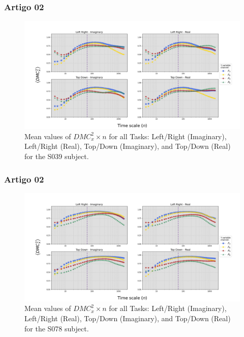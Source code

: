 \documentclass[11pt, aspectratio=169]{beamer}
\begin{document}
\begin{frame}
  \frametitle{Artigo 02}

  \begin{figure}[!h]
    \includegraphics[height=.5\paperheight]{../Figures/art_02/Fig5.jpg}
    \caption{Mean values of $DMC_{x}^{2} \times n$ for all Tasks: Left/Right (Imaginary), Left/Right (Real), Top/Down (Imaginary), and Top/Down (Real) for the S039 subject.}
    \label{fig05}
  \end{figure}
\end{frame}


\begin{frame}
  \frametitle{Artigo 02}

  \begin{figure}[!h]
    \includegraphics[height=.5\paperheight]{../Figures/art_02/Fig6.jpg}
    \caption{Mean values of $DMC_{x}^{2} \times n$ for all Tasks: Left/Right (Imaginary), Left/Right (Real), Top/Down (Imaginary), and Top/Down (Real) for the S078 subject.}
    \label{fig06}
  \end{figure}
\end{frame}
\end{document}
